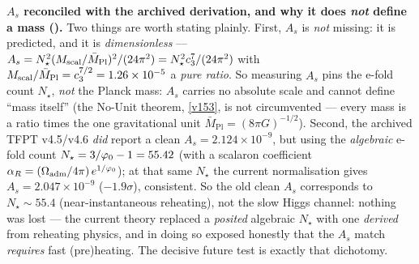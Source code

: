 \smallskip\noindent\textbf{$A_s$ reconciled with the archived derivation, and why it does \emph{not} define a
mass ().} Two things are worth stating plainly. First, $A_s$ is \emph{not} missing:
it is predicted, and it is \emph{dimensionless} --- $A_s=N_\star^2(M_{\mathrm{scal}}/\bar M_{\mathrm{Pl}})^2/(24\pi^2)
=N_\star^2c_3^7/(24\pi^2)$ with $M_{\mathrm{scal}}/\bar M_{\mathrm{Pl}}=c_3^{7/2}=1.26\times10^{-5}$ a
\emph{pure ratio}. So measuring $A_s$ pins the e-fold count $N_\star$, \emph{not} the Planck mass: $A_s$ carries no
absolute scale and cannot define ``mass itself'' (the No-Unit theorem, \vref{v153}, is not circumvented --- every
mass is a ratio times the one gravitational unit $\bar M_{\mathrm{Pl}}=(8\pi G)^{-1/2}$). Second, the archived TFPT
v4.5/v4.6 \emph{did} report a clean $A_s=2.124\times10^{-9}$, but using the \emph{algebraic} e-fold count
$N_\star=3/\varphi_0-1=55.42$ (with a scalaron coefficient $\alpha_R=(\Omega_{\mathrm{adm}}/4\pi)\,e^{1/\varphi_0}$); at that
same $N_\star$ the current normalisation gives $A_s=2.047\times10^{-9}$ ($-1.9\sigma$), consistent. So the old clean
$A_s$ corresponds to $N_\star\!\sim\!55.4$ (near-instantaneous reheating), not the slow Higgs channel: nothing was
lost --- the current theory replaced a \emph{posited} algebraic $N_\star$ with one \emph{derived} from reheating
physics, and in doing so exposed honestly that the $A_s$ match \emph{requires} fast (pre)heating. The decisive
future test is exactly that dichotomy.

